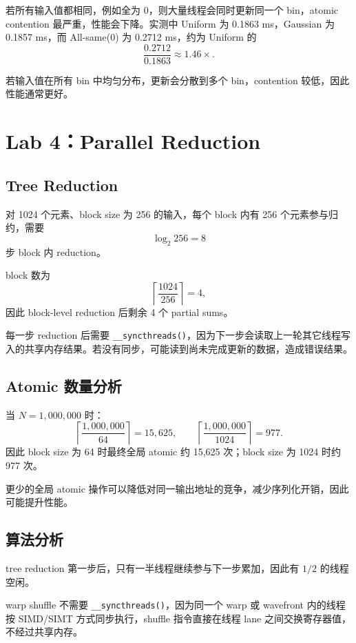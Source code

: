 \documentclass[UTF8,a4paper,12pt,fontset=none]{ctexart}
\begin{document}
若所有输入值都相同，例如全为 0，则大量线程会同时更新同一个 bin，atomic contention 最严重，性能会下降。实测中 Uniform 为 0.1863 ms，Gaussian 为 0.1857 ms，而 All-same(0) 为 0.2712 ms，约为 Uniform 的
\[
  \frac{0.2712}{0.1863}\approx1.46\times.
\]

若输入值在所有 bin 中均匀分布，更新会分散到多个 bin，contention 较低，因此性能通常更好。

\section{Lab 4：Parallel Reduction}

\subsection{Tree Reduction}

对 1024 个元素、block size 为 256 的输入，每个 block 内有 256 个元素参与归约，需要
\[
  \log_2 256=8
\]
步 block 内 reduction。

block 数为
\[
  \left\lceil\frac{1024}{256}\right\rceil=4,
\]
因此 block-level reduction 后剩余 4 个 partial sums。

每一步 reduction 后需要 \texttt{\_\_syncthreads()}，因为下一步会读取上一轮其它线程写入的共享内存结果。若没有同步，可能读到尚未完成更新的数据，造成错误结果。

\subsection{Atomic 数量分析}

当 $N=1,000,000$ 时：
\[
  \left\lceil\frac{1,000,000}{64}\right\rceil=15,625,
  \qquad
  \left\lceil\frac{1,000,000}{1024}\right\rceil=977.
\]
因此 block size 为 64 时最终全局 atomic 约 15,625 次；block size 为 1024 时约 977 次。

更少的全局 atomic 操作可以降低对同一输出地址的竞争，减少序列化开销，因此可能提升性能。

\subsection{算法分析}

tree reduction 第一步后，只有一半线程继续参与下一步累加，因此有 $1/2$ 的线程空闲。

warp shuffle 不需要 \texttt{\_\_syncthreads()}，因为同一个 warp 或 wavefront 内的线程按 SIMD/SIMT 方式同步执行，shuffle 指令直接在线程 lane 之间交换寄存器值，不经过共享内存。
\end{document}
